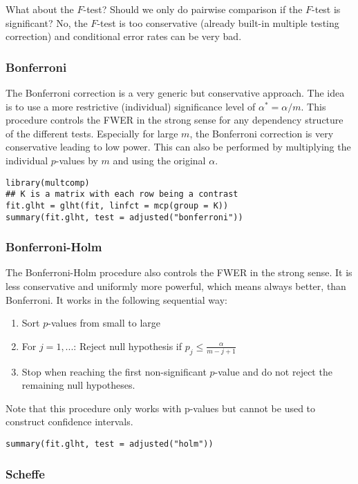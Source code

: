 What about the $F$-test? Should we only do pairwise comparison if the $F$-test is significant? No, the $F$-test is too conservative (already built-in multiple testing correction) and conditional error rates can be very bad.

\subsubsection{Bonferroni}

The Bonferroni correction is a very generic but conservative approach. The idea is to use a more restrictive (individual) significance level of $\alpha^* = \alpha / m$. This procedure controls the FWER in the strong sense for any dependency structure of the different tests. Especially for large $m$, the Bonferroni correction is very conservative leading to low power. This can also be performed by multiplying the individual $p$-values by $m$ and using the original $\alpha$.

\begin{lstlisting}
library(multcomp)
## K is a matrix with each row being a contrast
fit.glht = glht(fit, linfct = mcp(group = K))
summary(fit.glht, test = adjusted("bonferroni"))
\end{lstlisting}

\subsubsection{Bonferroni-Holm}

The Bonferroni-Holm procedure also controls the FWER in the strong sense. It is less conservative and uniformly more powerful, which means always better, than Bonferroni. It works in the following sequential way:
\begin{enumerate}
	\item Sort $p$-values from small to large
	\item For $j = 1,...$: Reject null hypothesis if $p_j \leq \frac{\alpha}{m-j+1}$
	\item Stop when reaching the first non-significant $p$-value and do not reject the remaining null hypotheses.
\end{enumerate}

Note that this procedure only works with p-values but cannot be used to construct confidence intervals.
\begin{lstlisting}
summary(fit.glht, test = adjusted("holm"))
\end{lstlisting}

\subsubsection{Scheffe}

